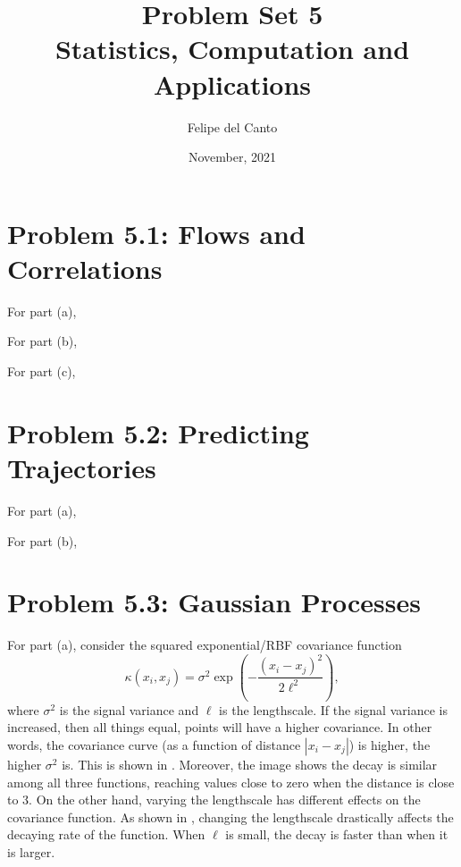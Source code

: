 \documentclass[11pt, english]{article}
\title{\bf Problem Set 5 \\ Statistics, Computation and
Applications\\[-1ex]}
\author{Felipe del Canto}
\date{November, 2021}
\begin{document}
    
\maketitle
   
\begin{multicols}{2}

\section*{Problem 5.1: Flows and Correlations}

For part (a),

For part (b),

For part (c),

\section*{Problem 5.2: Predicting Trajectories}

For part (a),

For part (b),


\section*{Problem 5.3: Gaussian Processes}

For part (a), consider the squared exponential/RBF covariance function
	$$\kappa(x_{i}, x_{j}) = \sigma^{2}\exp\left(-\frac{(x_{i} - x_{j})^{2}}{2\ell^{2}}\right),$$
where $\sigma^2$ is the signal variance and $\ell$ is the lengthscale. If the signal variance is increased, then all things equal, points will have a higher covariance. In other words, the covariance curve (as a function of distance $|x_{i} - x_{j}|$) is higher, the higher $\sigma^{2}$ is. This is shown in . Moreover, the image shows the decay is similar among all three functions, reaching values close to zero when the distance is close to 3. On the other hand, varying the lengthscale has different effects on the covariance function. As shown in , changing the lengthscale drastically affects the decaying rate of the function. When $\ell$ is small, the decay is faster than when it is larger.


\end{multicols}
\end{document}
